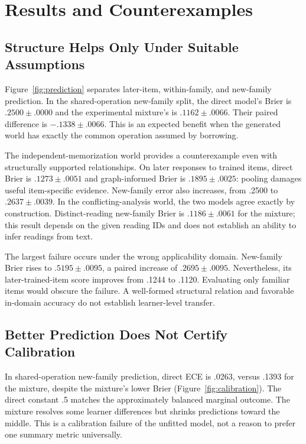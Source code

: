 \documentclass{article}
\begin{document}
\section{Results and Counterexamples}
\label{sec:results}

\subsection{Structure Helps Only Under Suitable Assumptions}

Figure~\ref{fig:prediction} separates later-item, within-family, and new-family prediction. In the shared-operation new-family split, the direct model's Brier is $.2500\pm.0000$ and the experimental mixture's is $.1162\pm.0066$. Their paired difference is $-.1338\pm.0066$. This is an expected benefit when the generated world has exactly the common operation assumed by borrowing.

The independent-memorization world provides a counterexample even with structurally supported relationships. On later responses to trained items, direct Brier is $.1273\pm.0051$ and graph-informed Brier is $.1895\pm.0025$: pooling damages useful item-specific evidence. New-family error also increases, from .2500 to $.2637\pm.0039$. In the conflicting-analysis world, the two models agree exactly by construction. Distinct-reading new-family Brier is $.1186\pm.0061$ for the mixture; this result depends on the given reading IDs and does not establish an ability to infer readings from text.

The largest failure occurs under the wrong applicability domain. New-family Brier rises to $.5195\pm.0095$, a paired increase of $.2695\pm.0095$. Nevertheless, its later-trained-item score improves from .1244 to .1120. Evaluating only familiar items would obscure the failure. A well-formed structural relation and favorable in-domain accuracy do not establish learner-level transfer.

\subsection{Better Prediction Does Not Certify Calibration}

In shared-operation new-family prediction, direct ECE is .0263, versus .1393 for the mixture, despite the mixture's lower Brier (Figure~\ref{fig:calibration}). The direct constant .5 matches the approximately balanced marginal outcome. The mixture resolves some learner differences but shrinks predictions toward the middle. This is a calibration failure of the unfitted model, not a reason to prefer one summary metric universally.
\end{document}
